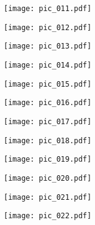 \documentclass[12pt,a4paper]{article}
\begin{document}
\newpage
\bigtitle
\begin{figure}[H]
\texttt{[image: pic\_011.pdf]}
\end{figure}

\newpage
\bigtitle
\begin{figure}[H]
\texttt{[image: pic\_012.pdf]}
\end{figure}

\newpage
\bigtitle
\begin{figure}[H]
\texttt{[image: pic\_013.pdf]}
\end{figure}

\newpage
\bigtitle
\begin{figure}[H]
\texttt{[image: pic\_014.pdf]}
\end{figure}

\newpage
\bigtitle
\begin{figure}[H]
\texttt{[image: pic\_015.pdf]}
\end{figure}

\newpage
\bigtitle
\begin{figure}[H]
\texttt{[image: pic\_016.pdf]}
\end{figure}

\newpage
\bigtitle
\begin{figure}[H]
\texttt{[image: pic\_017.pdf]}
\end{figure}

\newpage
\bigtitle
\begin{figure}[H]
\texttt{[image: pic\_018.pdf]}
\end{figure}

\newpage
\bigtitle
\begin{figure}[H]
\texttt{[image: pic\_019.pdf]}
\end{figure}

\newpage
\bigtitle
\begin{figure}[H]
\texttt{[image: pic\_020.pdf]}
\end{figure}

\newpage
\bigtitle
\begin{figure}[H]
\texttt{[image: pic\_021.pdf]}
\end{figure}

\newpage
\bigtitle
\begin{figure}[H]
\texttt{[image: pic\_022.pdf]}
\end{figure}
\end{document}
